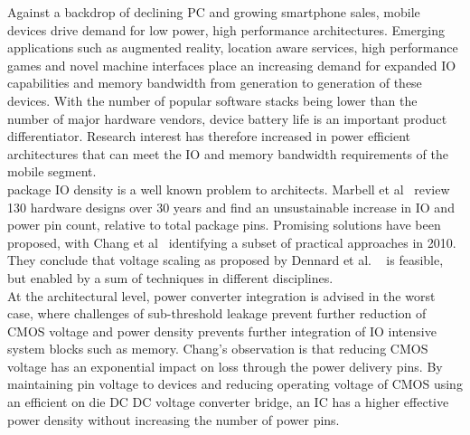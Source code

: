 \documentclass[letterpaper,twocolumn,10pt]{article}
\begin{document}

Against a backdrop of declining PC and growing smartphone sales, mobile devices drive demand for low power, high performance architectures. Emerging applications such as augmented reality, location aware services, high performance games and novel machine interfaces place an increasing demand for expanded IO capabilities and memory bandwidth from generation to generation of these devices. With the number of popular software stacks being lower than the number of major hardware vendors, device battery life is an important product differentiator. Research interest has therefore increased in power efficient architectures that can meet the IO and memory bandwidth requirements of the mobile segment.\\
\indent package IO density is a well known problem to architects. Marbell et al~\cite{Marbell2011} review 130 hardware designs over 30 years and find an unsustainable increase in IO and power pin count, relative to total package pins. Promising solutions have been proposed, with Chang et al~\cite{Chang2010} identifying a subset of practical approaches in 2010. They conclude that voltage scaling as proposed by Dennard et al. ~\cite{Dennard1974} is feasible, but enabled by a sum of techniques in different disciplines.\\
At the architectural level, power converter integration is advised in the worst case, where challenges of sub-threshold leakage prevent further reduction of CMOS voltage and power density prevents further integration of IO intensive system blocks such as memory. Chang's observation is that reducing CMOS voltage has an exponential impact on loss through the power delivery pins. By maintaining pin voltage to devices and reducing operating voltage of CMOS using an efficient on die DC DC voltage converter bridge, an IC has a higher effective power density without increasing the number of power pins.\\
\end{document}
